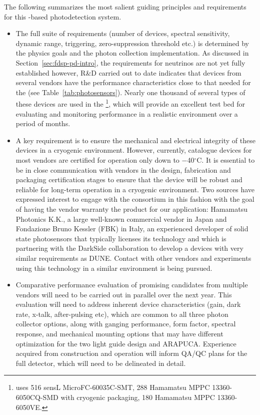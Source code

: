 The following summarizes the most salient guiding principles and requirements for this -based photodetection system.

\begin{itemize}

\item  The full suite of  requirements (number of devices, spectral sensitivity, dynamic range, triggering, 
zero-suppression threshold etc.) is determined by the physics goals and the photon collection implementation.  As discussed in Section~\ref{sec:fdsp-pd-intro},  the requirements for  neutrinos are not yet fully established however, 
R\&D carried out to date indicates that devices from several vendors have the 
performance characteristics close to that needed for the  (see Table~\ref{tab:photosensors}). 
Nearly one thousand of several types of these devices are used in the  \footnote{  uses 516 sensL MicroFC-60035C-SMT, 288 Hamamatsu MPPC 13360-6050CQ-SMD with cryogenic packaging, 180 Hamamatsu MPPC 13360-6050VE.}, which will provide an excellent test bed for evaluating and monitoring 
performance in a realistic environment over a period of months.

\item A key requirement is to ensure the mechanical and electrical integrity of these devices in a cryogenic environment. However, currently, catalogue devices for most vendors are certified for operation only down to \num{-40}$^\circ$C. It is essential to be in close communication with  vendors in the design, fabrication and  packaging certification stages to ensure that the device will be robust and reliable for long-term operation in a cryogenic environment. 
Two sources have expressed interest to engage with the consortium in this fashion with the goal of having the vendor warranty the product for our application: Hamamatsu Photonics K.K., a large well-known commercial vendor in Japan and Fondazione Bruno Kessler (FBK) in Italy, an experienced developer of solid state photosensors that typically licenses its technology and which is partnering with the DarkSide collaboration to develop a devices with very similar requirements as DUNE. 
Contact with other vendors and experiments using this technology in a similar environment is being pursued. 

\item Comparative performance evaluation of promising  candidates from
multiple vendors will need to be carried out in parallel over the next year. This evaluation will need to
address inherent device characteristics (gain, dark rate, x-talk, after-pulsing etc), which are common to all three photon collector options, along with ganging performance, form factor, spectral response, and mechanical mounting options that may have different optimization for the two light guide design and ARAPUCA.
Experience acquired from  construction and operation will inform QA/QC plans for the full detector, which will need to be delineated in detail.


\end{itemize}
